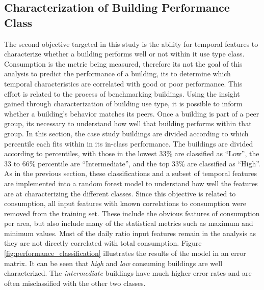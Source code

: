 \subsection{Characterization of Building Performance Class}
\label{sec:results_benchmarking}

The second objective targeted in this study is the ability for temporal features to characterize whether a building performs well or not within it use type class. Consumption is the metric being measured, therefore its not the goal of this analysis to predict the performance of a building, its to determine which temporal characteristics are correlated with good or poor performance. This effort is related to the process of benchmarking buildings. Using the insight gained through characterization of building use type, it is possible to inform whether a building's behavior matches its peers. Once a building is part of a peer group, its necessary to understand how well that building performs within that group. In this section, the case study buildings are divided according to which percentile each fits within in its in-class performance. The buildings are divided according to percentiles, with those in the lowest 33\% are classified as “Low”, the 33 to 66\% percentile are “Intermediate”, and the top 33\% are classified as “High”. As in the previous section, these classifications and a subset of temporal features are implemented into a random forest model to understand how well the features are at characterizing the different classes. Since this objective is related to consumption, all input features with known correlations to consumption were removed from the training set. These include the obvious features of consumption per area, but also include many of the statistical metrics such as maximum and minimum values. Most of the daily ratio input features remain in the analysis as they are not directly correlated with total consumption. Figure \ref{fig:performance_classification} illustrates the results of the model in an error matrix. It can be seen that \emph{high} and \emph{low} consuming buildings are well characterized. The \emph{intermediate} buildings have much higher error rates and are often misclassified with the other two classes.




